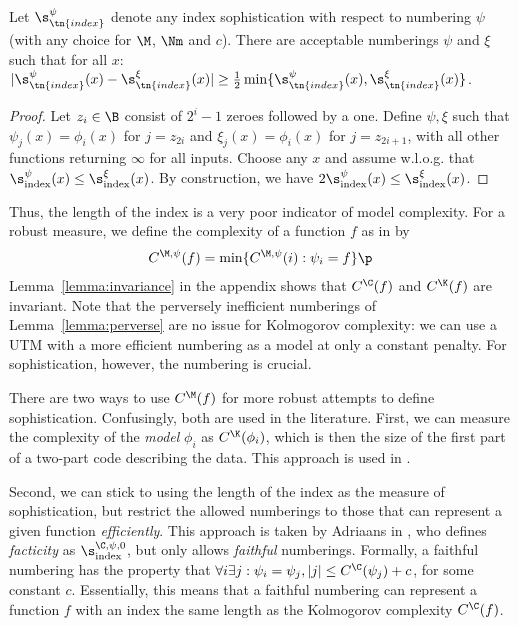 \begin{lemma}\label{lemma:perverse}
Let $\s_\tn{index}^\psi$ denote any index sophistication with respect to numbering $\psi$ (with any choice for $\M$, $\Nm$ and $c$). There are acceptable numberings $\psi$ and $\xi$ such that for all $x$: $|\s_\tn{index}^\psi(x) - \s_\tn{index}^\xi(x)|\geq \tfrac{1}{2}\min\{\s_\tn{index}^\psi(x),\s_\tn{index}^\xi(x)\}$.
\end{lemma}
\begin{proof}
Let $z_i \in \B$ consist of $2^{i}-1$ zeroes followed by a one. Define $\psi, \xi$ such that $\psi_j(x) = \phi_i(x)$ for $j = z_{2i}$ and $\xi_j(x) = \phi_i(x)$ for $j = z_{2i+1}$, with all other functions returning $\infty$ for all inputs. Choose any $x$ and assume w.l.o.g. that $\s_\text{index}^\psi(x)\le \s_\text{index}^\xi(x)$. By construction, we have $2\s_\text{index}^\psi(x)  \leq \s_\text{index}^\xi(x)$.
\end{proof}\enlargethispage{3\baselineskip}
Thus, the length of the index is a very poor indicator of model complexity. For a robust measure, we define the complexity of a function $f$ as in \cite{grunwald2004shannon,vitanyi2004meaningful} by 
\begin{align}
C^{\M,\psi}(f) = \min\{C^{\M,\psi}(i):\psi_i=f\} \p \label{equation:function-complexity}
\end{align}
Lemma~\ref{lemma:invariance} in the appendix shows that $C^\C(f)$ and $C^\K(f)$ are invariant. Note that the perversely inefficient numberings of Lemma~\ref{lemma:perverse} are no issue for Kolmogorov complexity: we can use a UTM with a more efficient numbering as a model at only a constant penalty. For sophistication, however, the numbering is crucial.

There are two ways to use $C^\M(f)$ for more robust attempts to define sophistication. Confusingly, both are used in the literature. First, we can measure the complexity of the \emph{model} $\phi_i$ as $C^\K(\phi_i)$, which is then the size of the first part of a two-part code describing the data. This approach is used in  \cite{cover1985kolmogorov,gacs2001algorithmic,vitanyi2004meaningful,gellmann1996information}.

Second, we can stick to using the length of the index as the measure of sophistication, but restrict the allowed numberings to those that can represent a given function \emph{efficiently}. This approach is taken by Adriaans in \cite{adriaans2012facticity}, who defines \emph{facticity} as $\s_\text{index}^{\C,\psi,0}$, but only allows \emph{faithful} numberings. Formally, a faithful numbering has the property that $\forall i \exists j : \psi_i=\psi_j, |j|\le C^{\C}(\psi_j)+c$, for some constant $c$. Essentially, this means that a faithful numbering can represent a function $f$ with an index the same length as the Kolmogorov complexity $C^\C(f)$.

